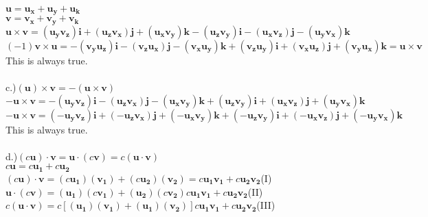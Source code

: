 \documentclass[12pt]{article}
\begin{document}
\noindent $\mathbf{u} = \mathbf{u_{x}} + \mathbf{u_{y}} + \mathbf{u_{k}}$\\
$\mathbf{v} = \mathbf{v_{x}} + \mathbf{v_{y}} + \mathbf{v_{k}}$\\
$\mathbf{u \times v } = (\mathbf{u_{y}v_{z}})\mathbf{i} + (\mathbf{u_{z}v_{x}})\mathbf{j} + (\mathbf{u_{x}v_{y}})\mathbf{k} -(\mathbf{u_{z}v_{y}})\mathbf{i} - (\mathbf{u_{x}v_{z}})\mathbf{j}-(\mathbf{u_{y}v_{x}})\mathbf{k}$\\

\noindent$(-1)\mathbf{v \times u } =- (\mathbf{v_{y}u_{z}})\mathbf{i} - (\mathbf{v_{z}u_{x}})\mathbf{j} - (\mathbf{v_{x}u_{y}})\mathbf{k} +(\mathbf{v_{z}u_{y}})\mathbf{i} + (\mathbf{v_{x}u_{z}})\mathbf{j}+(\mathbf{v_{y}u_{x}})\mathbf{k} = \mathbf{u \times v}$\\
This is always true.\\\\
\noindent c.)$(\mathbf{u})\times \mathbf{v} = -(\mathbf{u\times v})$\\
$-\mathbf{u \times v } = -(\mathbf{u_{y}v_{z}})\mathbf{i} - (\mathbf{u_{z}v_{x}})\mathbf{j} - (\mathbf{u_{x}v_{y}})\mathbf{k} +(\mathbf{u_{z}v_{y}})\mathbf{i} + (\mathbf{u_{x}v_{z}})\mathbf{j}+(\mathbf{u_{y}v_{x}})\mathbf{k}$\\
$\mathbf{-u \times v } = (\mathbf{-u_{y}v_{z}})\mathbf{i} + (\mathbf{-u_{z}v_{x}})\mathbf{j} + (\mathbf{-u_{x}v_{y}})\mathbf{k} +(\mathbf{-u_{z}v_{y}})\mathbf{i} + (\mathbf{-u_{x}v_{z}})\mathbf{j}+(\mathbf{-u_{y}v_{x}})\mathbf{k}$\\ This is always true.\\\\ 
\noindent d.)$(c\mathbf{u})\cdot \mathbf{v} = \mathbf{u \cdot} (c\mathbf{v}) = c(\mathbf{u \cdot v})$\\
\noindent$c \mathbf{u} = c\mathbf{u_{1}} + c\mathbf{u_{2}}$\\
\noindent$(c\mathbf{u})\cdot \mathbf{v} = (c\mathbf{u_{1}})(\mathbf{v_{1}}) + (c\mathbf{u_{2}})(\mathbf{v_{2}}) = c\mathbf{u_{1}v_{1}} + c\mathbf{u_{2}v_{2}}$\hspace{10pt}(I)\\
\noindent$ \mathbf{u \cdot} (c\mathbf{v}) = (\mathbf{u_{1}})(c\mathbf{v_{1}}) + (\mathbf{u_{2}})(c\mathbf{v_{2}}) c\mathbf{u_{1}v_{1}} + c\mathbf{u_{2}v_{2}}  $\hspace{10pt}(II)\\
\noindent$c(\mathbf{u \cdot v}) = c[(\mathbf{u_{1}})(\mathbf{v_{1}}) + (\mathbf{u_{1}})(\mathbf{v_{2}})] c\mathbf{u_{1}v_{1}} + c\mathbf{u_{2}v_{2}} $(III)\\
\end{document}
